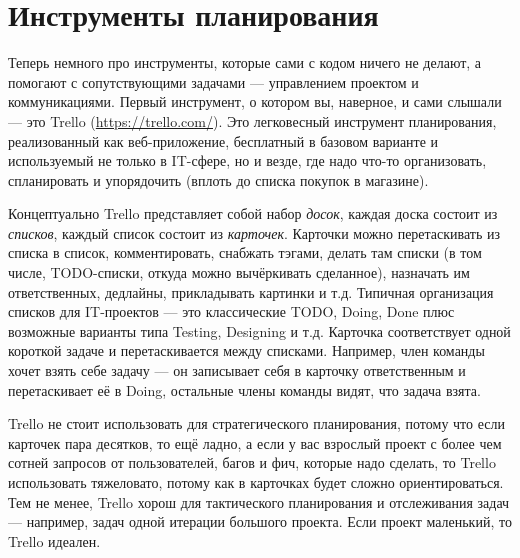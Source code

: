 \documentclass[a5paper]{article}
\begin{document}
\section{Инструменты планирования}

Теперь немного про инструменты, которые сами с кодом ничего не делают, а помогают с сопутствующими задачами --- управлением проектом и коммуникациями. Первый инструмент, о котором вы, наверное, и сами слышали --- это Trello (\url{https://trello.com/}). Это легковесный инструмент планирования, реализованный как веб-приложение, бесплатный в базовом варианте и используемый не только в IT-сфере, но и везде, где надо что-то организовать, спланировать и упорядочить (вплоть до списка покупок в магазине).

Концептуально Trello представляет собой набор \textit{досок}, каждая доска состоит из \textit{списков}, каждый список состоит из \textit{карточек}. Карточки можно перетаскивать из списка в список, комментировать, снабжать тэгами, делать там списки (в том числе, TODO-списки, откуда можно вычёркивать сделанное), назначать им ответственных, дедлайны, прикладывать картинки и т.д. Типичная организация списков для IT-проектов --- это классические TODO, Doing, Done плюс возможные варианты типа Testing, Designing и т.д. Карточка соответствует одной короткой задаче и перетаскивается между списками. Например, член команды хочет взять себе задачу --- он записывает себя в карточку ответственным и перетаскивает её в Doing, остальные члены команды видят, что задача взята.

Trello не стоит использовать для стратегического планирования, потому что если карточек пара десятков, то ещё ладно, а если у вас взрослый проект с более чем сотней запросов от пользователей, багов и фич, которые надо сделать, то Trello использовать тяжеловато, потому как в карточках будет сложно ориентироваться. Тем не менее, Trello хорош для тактического планирования и отслеживания задач --- например, задач одной итерации большого проекта. Если проект маленький, то Trello идеален.
\end{document}
